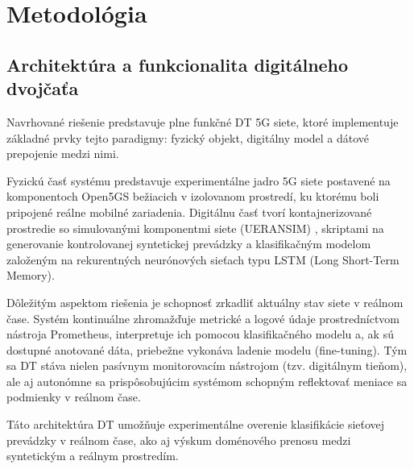 \documentclass[a4paper,10pt]{ieeetran}
\begin{document}


\section{Metodológia}
\label{sec3}

\subsection{Architektúra a funkcionalita digitálneho dvojčaťa}
\label{subsec_dt}

Navrhované riešenie predstavuje plne funkčné DT 5G siete, ktoré implementuje základné prvky tejto paradigmy: fyzický objekt, digitálny model a dátové prepojenie medzi nimi.

Fyzickú časť systému predstavuje experimentálne jadro 5G siete postavené na komponentoch Open5GS bežiacich v izolovanom prostredí, ku ktorému boli pripojené reálne mobilné zariadenia. Digitálnu časť tvorí kontajnerizované prostredie so simulovanými komponentmi siete (UERANSIM) \cite{whyueransim}, skriptami na generovanie kontrolovanej syntetickej prevádzky a klasifikačným modelom založeným na rekurentných neurónových sieťach typu LSTM (Long Short-Term Memory).

Dôležitým aspektom riešenia je schopnosť zrkadliť aktuálny stav siete v reálnom čase. Systém kontinuálne zhromažďuje metrické a logové údaje prostredníctvom nástroja Prometheus, interpretuje ich pomocou klasifikačného modelu a, ak sú dostupné anotované dáta, priebežne vykonáva ladenie modelu (fine-tuning). Tým sa DT stáva nielen pasívnym monitorovacím nástrojom (tzv. digitálnym tieňom), ale aj autonómne sa prispôsobujúcim systémom schopným reflektovať meniace sa podmienky v reálnom čase.

Táto architektúra DT umožňuje experimentálne overenie klasifikácie sieťovej prevádzky v reálnom čase, ako aj výskum doménového prenosu medzi syntetickým a reálnym prostredím.
\end{document}
